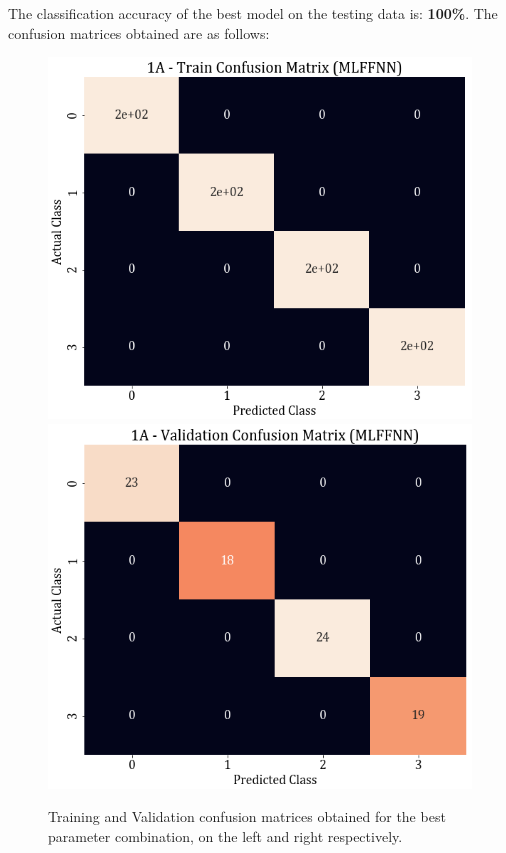 \documentclass[11pt,a4paper]{article}
\newcommand{\noi}{\noindent}
\begin{document}
\noi
The classification accuracy of the best model on the testing data is: \textbf{100\%}. The confusion matrices obtained are as follows:
\begin{figure}[H]
    \centering
    \includegraphics[scale=0.4]{images/1A_MLFFNN_train_confmat.png}
    \includegraphics[scale=0.4]{images/1A_MLFFNN_val_confmat.png}
    \caption{Training and Validation confusion matrices obtained for the best parameter combination, on the left and right respectively.}
\end{figure}
\end{document}

